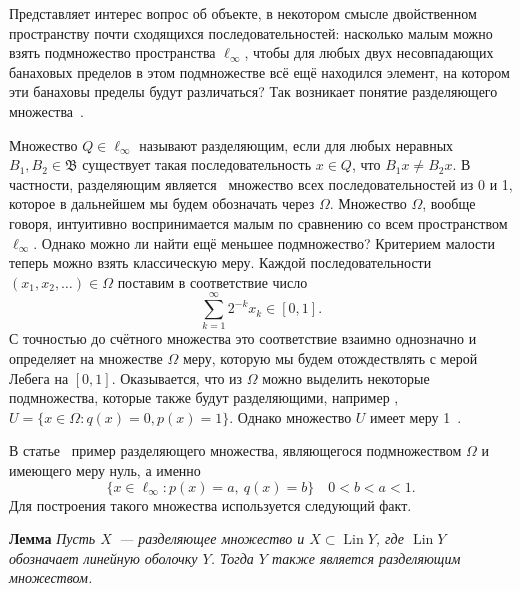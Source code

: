 \documentclass[a4paper,14pt]{article}
\begin{document}
Представляет интерес вопрос об объекте, в некотором смысле двойственном пространству почти сходящихся последовательностей:
насколько малым можно взять подмножество пространства $\ell_\infty$,
чтобы для любых двух несовпадающих банаховых пределов в этом подмножестве всё ещё находился элемент,
на котором эти банаховы пределы будут различаться?
Так возникает понятие разделяющего множества~\cite[\S 3]{Semenov2014geomprops}.

Множество $Q\in\ell_\infty$ называют разделяющим, если
для любых неравных $B_1, B_2\in\mathfrak{B}$ существует такая последовательность $x\in Q$,
что $B_1 x \neq B_2 x$.
В частности, разделяющим является~\cite{semenov2010characteristic} множество всех последовательностей из 0 и 1,
которое в дальнейшем мы будем обозначать через $\Omega$.
Множество $\Omega$, вообще говоря, интуитивно воспринимается малым по сравнению со всем пространством $\ell_\infty$.
Однако можно ли найти ещё меньшее подмножество? Критерием малости теперь можно взять классическую меру.
Каждой последовательности $(x_1, x_2, \dots)\in \Omega$ поставим в соответствие число
\begin{equation}\label{eq:bijection_omega_0_1}
	\sum_{k=1}^\infty 2^{-k} x_k \in [0,1]
	.
\end{equation}
С точностью до счётного множества это соответствие взаимно однозначно и определяет на множестве $\Omega$ меру,
которую мы будем отождествлять с мерой Лебега на $[0,1]$.
Оказывается, что из $\Omega$ можно выделить некоторые подмножества, которые также будут разделяющими,
например \cite[\S 3, Теорема 11]{Semenov2014geomprops},
$
	U = \{ x\in\Omega: q(x) = 0, p(x) = 1 \}
	.
$
Однако множество $U$ имеет меру 1~\cite{semenov2010characteristic}.


В статье~\cite{avdeev2021vestnik} пример разделяющего множества,
являющегося подмножеством $\Omega$ и имеющего меру нуль,
а именно
\begin{equation}
	\{x\in\ell_\infty : p(x) = a,~ q(x) = b\}\quad 0 < b < a < 1
	.
\end{equation}
Для построения такого множества используется следующий факт.

\textbf{Лемма}{\cite[\S 3, замечание 6]{Semenov2014geomprops}}{\sl
	Пусть $X$~--- разделяющее множество и $X \subset \operatorname{Lin} Y$,
	где $\operatorname{Lin} Y$ обозначает линейную оболочку $Y$.
	Тогда $Y$ также является разделяющим множеством.
}
\end{document}
